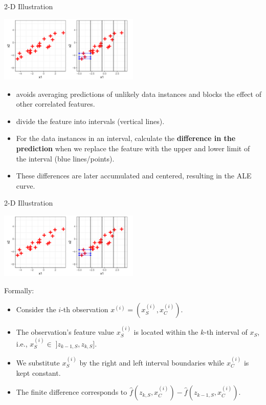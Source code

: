 \documentclass[aspectratio=169]{../latex_main/tntbeamer}  %
\begin{document}
\begin{frame}{2-D Illustration}
\vspace{-1em}
\begin{center}
\includegraphics[width=0.5\textwidth]{figure/2D01.png}
\end{center}

\begin{itemize}
    \item avoids averaging predictions of unlikely data instances and blocks the effect of other correlated features.
    \pause
    \item divide the feature into intervals (vertical lines).
    \pause
    \item For the data instances in an interval, calculate the \textbf{difference in the prediction} when we replace the feature with the upper and lower limit of the interval (blue lines/points).
    \pause
    \item These differences are later accumulated and centered, resulting in the ALE curve.
\end{itemize} 

\end{frame}
\begin{frame}{2-D Illustration}
\vspace{-1em}
\begin{center}
\includegraphics[width=0.5\textwidth]{figure/2D01.png}
\end{center}

\vspace{-1em}
Formally:
 \begin{itemize}
  \item  Consider the $i$-th observation $ x^{(i)} = (x_S^{(i)}, x^{(i)}_C)$. 
  \pause
  \item The observation's feature value $x_S^{(i)}$ is located within the $k$-th interval of $x_S$, i.e., $x_S^{(i)} \in \; ]z_{k-1, S}, z_{k, S}]$. 
  \pause
  \item We substitute $x_S^{(i)}$ by the right and left interval boundaries while $x^{(i)}_C$ is kept constant. 
  \pause
  \item The finite difference corresponds to $\hat{f}(z_{k, S}, x^{(i)}_C) - \hat{f}(z_{k-1, S}, x^{(i)}_C)$.
\end{itemize}


\end{frame}
\end{document}
